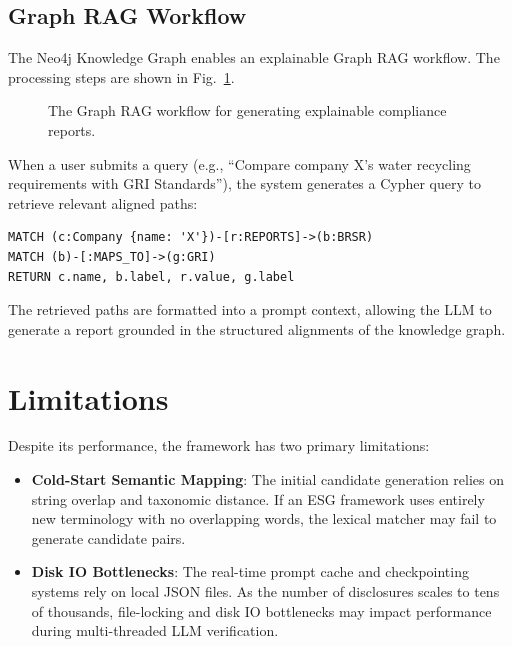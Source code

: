 \documentclass[journal,compsoc]{IEEEtran}
\begin{document}
\begin{itemize}
\begin{table}[t]
\subsection{Graph RAG Workflow}
The Neo4j Knowledge Graph enables an explainable Graph RAG workflow. The processing steps are shown in Fig.~\ref{fig:rag_work}.

\begin{figure}[h]
\centering
{}
\caption{The Graph RAG workflow for generating explainable compliance reports.}
\label{fig:rag_work}
\end{figure}

When a user submits a query (e.g., ``Compare company X's water recycling requirements with GRI Standards''), the system generates a Cypher query to retrieve relevant aligned paths:
\begin{verbatim}
MATCH (c:Company {name: 'X'})-[r:REPORTS]->(b:BRSR)
MATCH (b)-[:MAPS_TO]->(g:GRI)
RETURN c.name, b.label, r.value, g.label
\end{verbatim}
The retrieved paths are formatted into a prompt context, allowing the LLM to generate a report grounded in the structured alignments of the knowledge graph.

\section{Limitations}
Despite its performance, the framework has two primary limitations:
\begin{itemize}
    \item \textbf{Cold-Start Semantic Mapping}: The initial candidate generation relies on string overlap and taxonomic distance. If an ESG framework uses entirely new terminology with no overlapping words, the lexical matcher may fail to generate candidate pairs.
    \item \textbf{Disk IO Bottlenecks}: The real-time prompt cache and checkpointing systems rely on local JSON files. As the number of disclosures scales to tens of thousands, file-locking and disk IO bottlenecks may impact performance during multi-threaded LLM verification.
\end{itemize}


\end{table}
\end{itemize}
\end{document}
